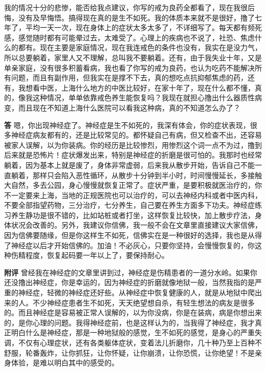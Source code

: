 \begin{case}
    我的情况十分的悲惨，能否给我点建议，你写的戒为良药全都看了，现在我很后悔，没有及早悔悟。搞得现在真的是生不如死。我的体质本来就不是很好，撸了七年了，平均一天一次，现在身体上的症状太多太多了，不详细写了。每天都有频死感，感觉随时都有可能晕过去，太难受了。心理上的疾病也不说了，社恐、焦虑什么的都有。现在主要是家庭情况，现在我连戒色的条件也没有，我实在是没力气，所以总要躺着，家里人又不理解，总叫我不要躺着。还有，由于我失业十年，又是单亲家庭，没有很多积蓄看病，我也看了你写的戒为良药，也认为吃药不能解决所有问题，而且有副作用，但我实在是撑不下去，真的想吃点抗抑郁焦虑的药，还有，我想看中医，上海什么地方的中医比较好，在家十年了，现在什么都不懂，真的，像我这种情况，单单依靠戒色养生能恢复吗？我现在就担心撸出什么器质性病变，而且现在不知道上海什么医院可以看我这种病，真的不知道怎么办了？

    \textbf{答} 嗯，你出现神经症了。神经症是生不如死的，我深有体会，你的症状表现，很多神经症病友都有的，还是比较常见的。都怀疑自己有病，但又检查不出，还容易被家人误解，以为你装病。你的经历是比较惨烈，用惨烈这个词一点不为过，撸到后来就是恐怖片！症状爆发出来，特别是神经症的折磨是很可怕的。我那时也经常躺着，因为基本上就是废了，身体非常虚弱，后来我从散步开始，告诉自己不能一直躺着，那样只会陷入恶性循环，从散步十分钟到半小时，时间慢慢延长，多接触大自然，多去公园，身心慢慢就恢复正常了。症状严重，是要积极就医治疗的，你不一定要来上海，当地的正规医院也可以治疗的，可以去神经内科或者中医内科，不要全部指望药物，三分治疗，七分养生，自己要在养生方面多下功夫。神经症练习养生静功是很不错的，比如站桩或者打坐，这样恢复比较快，加上散步疗法，身体状况会改善的。另外，我建议你信佛，我一般不会在文章里直接建议大家信佛，因为信佛要随缘，但是你这样生不如死，信佛实在是一种很好的选择，我也是从得了神经症以后才开始信佛的。加油！不必灰心，只要你坚持，会慢慢恢复的，你这种伤精程度，恢复起码要一年以上了，要保持耐心。

    \textbf{附评} 曾经我在神经症的文章里讲到过，神经症是伤精患者的一道分水岭。如果你还没撸出神经症，你是幸运的，因为神经症的折磨就像地狱一般，当然我指的是严重的神经症，轻微的神经症还好些。从神经症中恢复健康的人，就是从地狱中爬出来的人。不少神经症患者生不如死，天天绝望想自杀，有轻生想法的病友是很多的。而且神经症是容易被正常人误解的，以为你没病，你是在装病，病是你想出来的，是你心理的问题。我得神经症前，也是这样认为的，当我得了神经症，我才真正明白什么是神经症，那是一种地狱般的感觉，生不如死的感觉，是身心的严重失调，不仅有心理症状，还有各类躯体症状，变着法儿折磨你，几十种乃至上百种不舒服，轮番轰炸，让你抓狂，让你怀疑，让你崩溃，让你恐慌，让你绝望！不是亲身体验，是难以明白其中的感受的。


\end{case}
